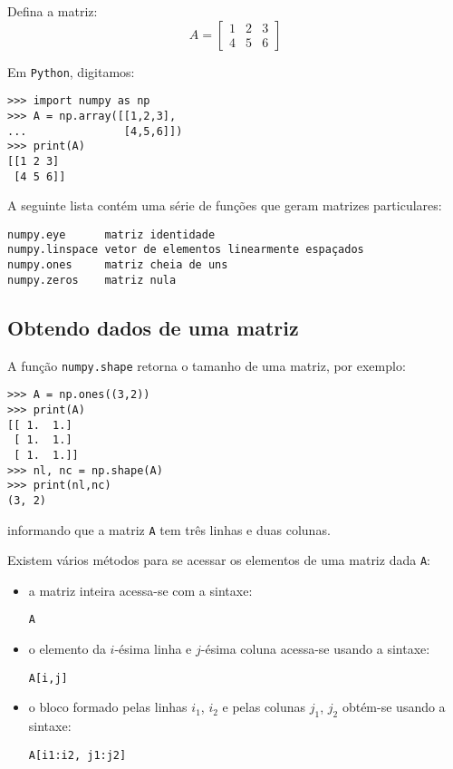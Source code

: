 \begin{ex}
  Defina a matriz:
  \begin{equation*}
    A = \left[
      \begin{array}{ccc}
        1 & 2 & 3\\
        4 & 5 & 6
      \end{array}
\right]
  \end{equation*}
\end{ex}
\begin{sol}
  Em \verb+Python+, digitamos:
\begin{verbatim}
>>> import numpy as np
>>> A = np.array([[1,2,3],
...               [4,5,6]])
>>> print(A)
[[1 2 3]
 [4 5 6]]
\end{verbatim}
\end{sol}

A seguinte lista contém uma série de funções que geram matrizes particulares:
\begin{verbatim}
numpy.eye      matriz identidade
numpy.linspace vetor de elementos linearmente espaçados
numpy.ones     matriz cheia de uns
numpy.zeros    matriz nula
\end{verbatim}

\subsection{Obtendo dados de uma matriz}

A função \verb+numpy.shape+ retorna o tamanho de uma matriz, por exemplo:
\begin{verbatim}
>>> A = np.ones((3,2))
>>> print(A)
[[ 1.  1.]
 [ 1.  1.]
 [ 1.  1.]]
>>> nl, nc = np.shape(A)
>>> print(nl,nc)
(3, 2)
\end{verbatim}
informando que a matriz \verb+A+ tem três linhas e duas colunas.

Existem vários métodos para se acessar os elementos de uma matriz dada \verb+A+:
\begin{itemize}
\item a matriz inteira acessa-se com a sintaxe:
\begin{verbatim}
A
\end{verbatim}
\item o elemento da $i$-ésima linha e $j$-ésima coluna acessa-se usando a sintaxe:
\begin{verbatim}
A[i,j]
\end{verbatim}
\item o bloco formado pelas linhas $i_1$, $i_2$ e pelas colunas $j_1$, $j_2$ obtém-se usando a sintaxe:
\begin{verbatim}
A[i1:i2, j1:j2]
\end{verbatim}
\end{itemize}

